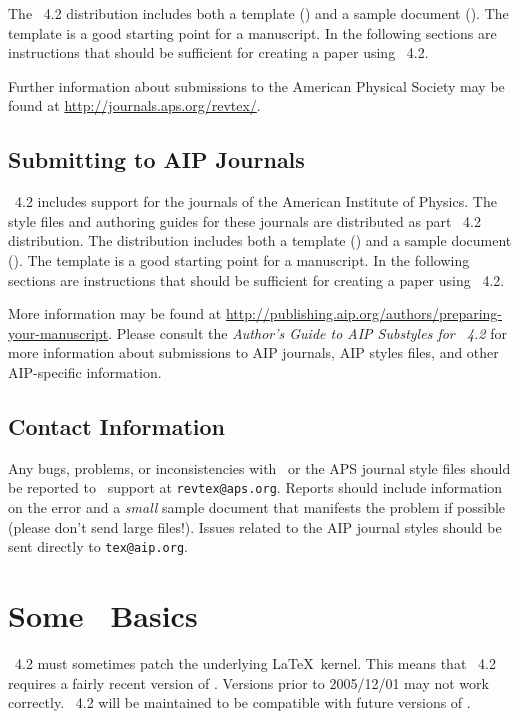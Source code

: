\documentclass[%
,aps%
 ,twocolumn%
 ,secnumarabic%
,amssymb, amsmath,nobibnotes, aps, prl, floatfix]{revtex4-2}
\begin{document}
The \revtex~4.2 distribution includes both a template
() and a sample document ().
The template is a good starting point for a manuscript. In the
following sections are instructions that should be sufficient for
creating a paper using \revtex~4.2.

Further information about submissions to the American
Physical Society may be found at \url{http://journals.aps.org/revtex/}.

\subsection{Submitting to AIP Journals}

\revtex~4.2 includes support for the journals of the American Institute of Physics.
The style files and authoring guides for these journals are distributed as part
\revtex~4.2 distribution. The distribution includes both a template
() and a sample document ().
The template is a good starting point for a manuscript. In the
following sections are instructions that should be sufficient for
creating a paper using \revtex~4.2.



More information may be found at 
\url{http://publishing.aip.org/authors/preparing-your-manuscript}. Please consult the \textit{Author's Guide to AIP Substyles for \revtex~4.2} for more information about submissions to AIP journals, AIP styles files, and other AIP-specific information.

\subsection{Contact Information}\label{sec:aipresources}%
Any bugs, problems, or inconsistencies with \revtex\ or the APS journal style files should be reported to
\revtex\ support at \verb+revtex@aps.org+. Reports should include information on the error and a \textit{small}
sample document that manifests the problem if possible (please don't send large files!). Issues related to the AIP journal styles should be sent directly to \verb+tex@aip.org+.

\section{Some \LaTeXe\ Basics}
\revtex~4.2 must sometimes patch the underlying
\LaTeX\ kernel. This means that \revtex~4.2 requires a fairly recent version of
\LaTeXe. Versions prior to 2005/12/01 may not work
correctly. \revtex~4.2 will be maintained to be compatible with future
versions of \LaTeXe.
\end{document}
